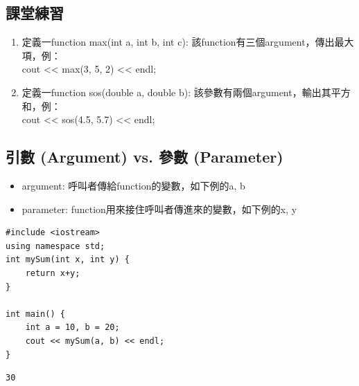 \documentclass[a4paper,12pt]{article}
\begin{document}
\subsection{課堂練習}
\label{sec:org4beb940}
\begin{enumerate}
\item 定義一function max(int a, int b, int c): 該function有三個argument，傳出最大項，例：\\
cout << max(3, 5, 2) << endl;\\
\item 定義一function sos(double a, double b): 該參數有兩個argument，輸出其平方和，例：\\
cout << sos(4.5, 5.7) << endl;\\
\end{enumerate}
\subsection{引數 (Argument) vs. 參數 (Parameter)}
\label{sec:org67534d8}
\begin{itemize}
\item argument: 呼叫者傳給function的變數，如下例的a, b\\
\item parameter: function用來接住呼叫者傳進來的變數，如下例的x, y\\
\end{itemize}
\lstset{breaklines=true,language=cpp,label= ,caption= ,captionpos=b,firstnumber=1,numbers=left}
\begin{lstlisting}
#include <iostream>
using namespace std;
int mySum(int x, int y) {
    return x+y;
}

int main() {
    int a = 10, b = 20;
    cout << mySum(a, b) << endl;
}

\end{lstlisting}

\begin{verbatim}
30
\end{verbatim}
\end{document}
